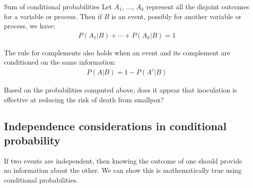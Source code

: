 \begin{onebox}{Sum of conditional probabilities}
Let $A_1$, ..., $A_k$ represent all the disjoint outcomes for a variable or process. Then if $B$ is an event, possibly for another variable or process, we have: \vspace{-1mm}
\begin{align*}
P(A_1|B) + \cdots + P(A_k|B) = 1
\end{align*}%
\vspace{-5.5mm} \par
The rule for complements also holds when an event and its complement are conditioned on the same information: \vspace{-1.5mm}
\begin{align*}
P(A | B) = 1 - P(A^c | B)
\end{align*}
\end{onebox}

\begin{exercisewrap}
\begin{nexercise}
Based on the probabilities computed above, does it appear that inoculation is effective at reducing the risk of death from smallpox?\footnotemark
\end{nexercise}
\end{exercisewrap}

\subsection{Independence considerations in conditional probability}

If two events are independent, then knowing the outcome of one should provide no information about the other. We can show this is mathematically true using conditional probabilities.

